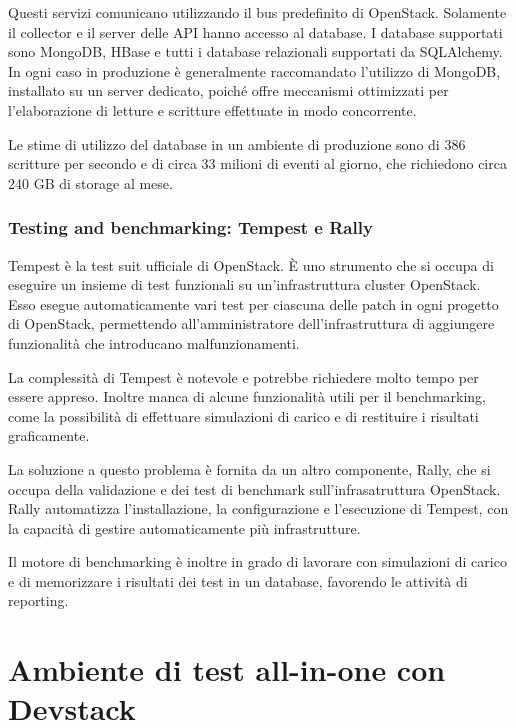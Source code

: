 \documentclass[../main.tex]{subfiles}
\begin{document}
Questi servizi comunicano utilizzando il bus predefinito di OpenStack. Solamente il collector e il server delle API hanno accesso al database.
I database supportati sono MongoDB, HBase e tutti i database relazionali  supportati da SQLAlchemy.
In ogni caso in produzione è generalmente raccomandato l'utilizzo di MongoDB,  installato su un server dedicato, poiché offre meccanismi ottimizzati per l'elaborazione di letture e scritture effettuate in modo concorrente.

Le stime di utilizzo del database in un ambiente di produzione sono di 386 scritture per secondo e di circa 33 milioni di eventi al giorno, che richiedono circa 240 GB di storage al mese.

\subsubsection{Testing and benchmarking: Tempest e Rally}
Tempest è la test suit ufficiale di OpenStack. \`E uno strumento che si occupa di eseguire un insieme di test funzionali su un'infrastruttura cluster OpenStack.
Esso esegue automaticamente vari test per ciascuna delle patch in ogni progetto di OpenStack, permettendo all'amministratore dell'infrastruttura di aggiungere funzionalità che introducano malfunzionamenti.

La complessità di Tempest è notevole e potrebbe richiedere molto tempo per essere appreso. Inoltre manca di alcune funzionalità utili per il benchmarking, come la possibilità di effettuare simulazioni di carico e di restituire i risultati graficamente.

La soluzione a questo problema è fornita da un altro componente, Rally, che si occupa della validazione e dei test di benchmark sull'infrasatruttura OpenStack.
Rally automatizza l'installazione, la configurazione e l'esecuzione di Tempest, con la capacità di gestire automaticamente più infrastrutture.

Il motore di benchmarking è inoltre in grado di lavorare con simulazioni di carico e di memorizzare i risultati dei test in un database, favorendo le attività di reporting.
\vfill
\newpage

\section{Ambiente di test all-in-one con Devstack}
\end{document}
